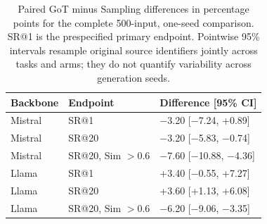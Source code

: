 \begin{table}[!htbp]
\centering
\setlength{\tabcolsep}{4pt}
\caption{Paired GoT minus Sampling differences in percentage points for the complete 500-input, one-seed comparison. SR@1 is the prespecified primary endpoint. Pointwise 95\% intervals resample original source identifiers jointly across tasks and arms; they do not quantify variability across generation seeds.}
\label{tab:supp-got-difference}
\begin{tabular}{lll}
\toprule
Backbone & Endpoint & Difference [95\% CI] \\
\midrule
Mistral & SR@1 & $-$3.20 [$-$7.24, +0.89] \\
Mistral & SR@20 & $-$3.20 [$-$5.83, $-$0.74] \\
Mistral & SR@20, Sim $>0.6$ & $-$7.60 [$-$10.88, $-$4.36] \\
Llama & SR@1 & +3.40 [$-$0.55, +7.27] \\
Llama & SR@20 & +3.60 [+1.13, +6.08] \\
Llama & SR@20, Sim $>0.6$ & $-$6.20 [$-$9.06, $-$3.35] \\
\bottomrule
\end{tabular}
\end{table}
